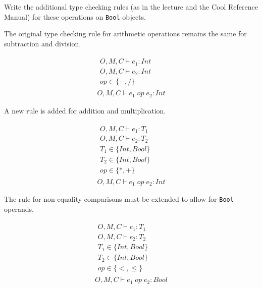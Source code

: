 \documentclass[11pt]{article}
\begin{document}
\begin{enumerate}
Write the additional type checking rules (as in the lecture and the
Cool Reference Manual) for these operations on \texttt{Bool} objects.

The original type checking rule for arithmetic operations remains the
same for subtraction and division.

\begin{equation}
\begin{array}{c}
\begin{array}{l}
O, M, C \vdash e_{1} : Int \\
O, M, C \vdash e_{2} : Int \\
op \in \{-, /\}
\end{array} \\
\hline
O, M, C \vdash e_{1} \; op \; e_{2} : Int
\end{array}
\tag*{[Arith]}
\end{equation}

A new rule is added for addition and multiplication.

\begin{equation}
\begin{array}{c}
\begin{array}{l}
O, M, C \vdash e_{1} : T_{1} \\
O, M, C \vdash e_{2} : T_{2} \\
T_{1} \in \{Int, Bool\} \\
T_{2} \in \{Int, Bool\} \\
op \in \{*, +\}
\end{array} \\
\hline
O, M, C \vdash e_{1} \; op \; e_{2} : Int
\end{array}
\tag*{[Add-Mul]}
\end{equation}

The rule for non-equality comparisons must be extended to allow for
\texttt{Bool} operands.

\begin{equation}
\begin{array}{c}
\begin{array}{l}
O, M, C \vdash e_{1} : T_{1} \\
O, M, C \vdash e_{2} : T_{2} \\
T_{1} \in \{Int, Bool\} \\
T_{2} \in \{Int, Bool\} \\
op \in \{<, \leq\}
\end{array} \\
\hline
O, M, C \vdash e_{1} \; op \; e_{2} : Bool
\end{array}
\tag*{[Compare]}
\end{equation}


\end{enumerate}
\end{document}

